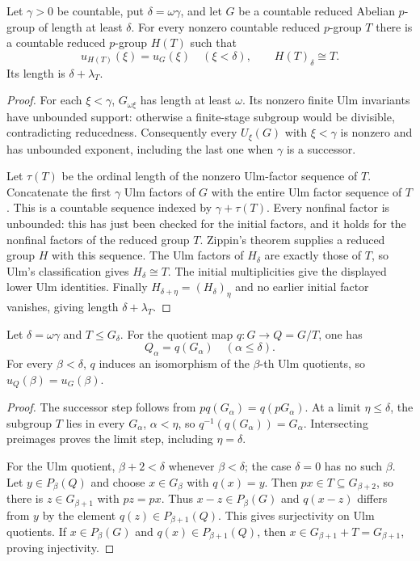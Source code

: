 \documentclass[11pt]{article}
\begin{document}
\begin{lemma}
\label{lem:prescribed-tail}
Let $\gamma>0$ be countable, put $\delta=\omega\gamma$, and let $G$
be a countable reduced Abelian $p$-group of length at least $\delta$.
For every nonzero countable reduced $p$-group $T$ there is a countable
reduced $p$-group $H(T)$ such that
\[
 u_{H(T)}(\xi)=u_G(\xi)\quad(\xi<\delta),
 \qquad H(T)_\delta\cong T.
\]
Its length is $\delta+\lambda_T$.
\end{lemma}

\begin{proof}
For each $\xi<\gamma$, $G_{\omega\xi}$ has length at least $\omega$.
Its nonzero finite Ulm invariants have unbounded support: otherwise a
finite-stage subgroup would be divisible, contradicting reducedness.
Consequently every $U_\xi(G)$ with $\xi<\gamma$ is nonzero and has
unbounded exponent, including the last one when $\gamma$ is a successor.

Let $\tau(T)$ be the ordinal length of the nonzero Ulm-factor sequence
of $T$. Concatenate the first $\gamma$ Ulm factors of $G$ with the entire Ulm
factor sequence of $T$. This is a countable sequence indexed by
$\gamma+\tau(T)$. Every nonfinal factor is unbounded: this has just
been checked for the initial factors, and it holds for the nonfinal
factors of the reduced group $T$. Zippin's theorem supplies a reduced
group $H$ with this sequence. The Ulm factors of $H_\delta$ are exactly
those of $T$, so Ulm's classification gives $H_\delta\cong T$.
The initial multiplicities give the displayed lower Ulm identities.
Finally $H_{\delta+\eta}=(H_\delta)_\eta$ and no earlier initial
factor vanishes, giving length $\delta+\lambda_T$.
\end{proof}

\begin{lemma}
\label{lem:quotient-filtration}
Let $\delta=\omega\gamma$ and $T\le G_\delta$. For the quotient
map $q:G\to Q=G/T$, one has
\[
 Q_\alpha=q(G_\alpha)\quad(\alpha\le\delta).
\]
For every $\beta<\delta$, $q$ induces an isomorphism of the
$\beta$-th Ulm quotients, so $u_Q(\beta)=u_G(\beta)$.
\end{lemma}

\begin{proof}
The successor step follows from $p q(G_\alpha)=q(pG_\alpha)$.
At a limit $\eta\le\delta$, the subgroup $T$ lies in every
$G_\alpha$, $\alpha<\eta$, so
$q^{-1}(q(G_\alpha))=G_\alpha$. Intersecting preimages proves
the limit step, including $\eta=\delta$.

For the Ulm quotient, $\beta+2<\delta$ whenever $\beta<\delta$;
the case $\delta=0$ has no such $\beta$. Let $y\in P_\beta(Q)$
and choose $x\in G_\beta$ with $q(x)=y$. Then
$px\in T\subseteq G_{\beta+2}$, so there is $z\in G_{\beta+1}$
with $pz=px$. Thus $x-z\in P_\beta(G)$ and
$q(x-z)$ differs from $y$ by the element $q(z)\in P_{\beta+1}(Q)$.
This gives surjectivity on Ulm quotients. If $x\in P_\beta(G)$ and
$q(x)\in P_{\beta+1}(Q)$, then
$x\in G_{\beta+1}+T=G_{\beta+1}$, proving injectivity.
\end{proof}
\end{document}
